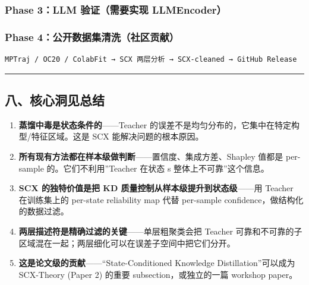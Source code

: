 \documentclass[
  12pt,
]{ctexart}
\begin{document}
\subsubsection{Phase 3：LLM 验证（需要实现
LLMEncoder）}\label{phase-3llm-ux9a8cux8bc1ux9700ux8981ux5b9eux73b0-llmencoder}

\subsubsection{Phase
4：公开数据集清洗（社区贡献）}\label{phase-4ux516cux5f00ux6570ux636eux96c6ux6e05ux6d17ux793eux533aux8d21ux732e}

\begin{verbatim}
MPTraj / OC20 / ColabFit → SCX 两层分析 → SCX-cleaned → GitHub Release
\end{verbatim}

\begin{center}\rule{0.5\linewidth}{0.5pt}\end{center}

\subsection{八、核心洞见总结}\label{ux516bux6838ux5fc3ux6d1eux89c1ux603bux7ed3}

\begin{enumerate}
\def\labelenumi{\arabic{enumi}.}
\item
  \textbf{蒸馏中毒是状态条件的}------Teacher
  的误差不是均匀分布的，它集中在特定构型/特征区域。这是 SCX
  能解决问题的根本原因。
\item
  \textbf{所有现有方法都在样本级做判断}------置信度、集成方差、Shapley
  值都是 per-sample 的。它们不利用''Teacher 在状态 s
  整体上不可靠''这个信息。
\item
  \textbf{SCX 的独特价值是把 KD 质量控制从样本级提升到状态级}------用
  Teacher 在训练集上的 per-state reliability map 代替 per-sample
  confidence，做结构化的数据过滤。
\item
  \textbf{两层描述符是精确过滤的关键}------单层粗聚类会把 Teacher
  可靠和不可靠的子区域混在一起；两层细化可以在误差子空间中把它们分开。
\item
  \textbf{这是论文级的贡献}------``State-Conditioned Knowledge
  Distillation''可以成为 SCX-Theory (Paper 2) 的重要
  subsection，或独立的一篇 workshop paper。
\end{enumerate}
\end{document}
